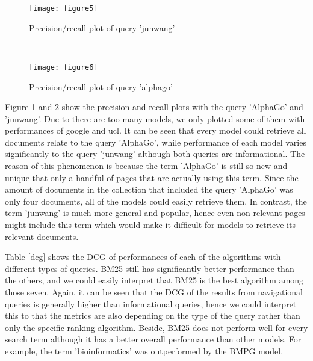 \begin{figure*}[!t]
    \centering
    \begin{subfigure}{0.5\textwidth}
        \centering
        \texttt{[image: figure5]}
        \caption{Precision/recall plot of query 'junwang'}
        \label{fig:junwang}
        \vskip -6pt
    \end{subfigure}%
    ~ 
    \begin{subfigure}{0.5\textwidth}
        \centering
        \texttt{[image: figure6]}
        \caption{Precision/recall plot of query 'alphago'}
        \label{fig:alphago}
        \vskip -6pt
    \end{subfigure}
    \caption{Precision/recall curves for two example queries.}
\end{figure*}

Figure \ref{fig:junwang} and \ref{fig:alphago} show the precision and recall plots with the query 'AlphaGo' and 'junwang'. Due to there are too many models, we only plotted some of them with performances of google and ucl. It can be seen that every model could retrieve all documents relate to the query 'AlphaGo', while performance of each model varies significantly to the query 'junwang' although both queries are informational. The reason of this phenomenon is because the term 'AlphaGo' is still so new and unique that only a handful of pages that are actually using this term. Since the amount of documents in the collection that included the query 'AlphaGo' was only four documents, all of the models could easily retrieve them. In contrast, the term 'junwang' is much more general and popular, hence even non-relevant pages might include this term which would make it difficult for models to retrieve its relevant documents.

Table \ref{dcg} shows the DCG of performances of each of the algorithms with different types of queries. BM25 still has significantly better performance than the others, and we could easily interpret that BM25 is the best algorithm among those seven. Again, it can be seen that the DCG of the results from navigational queries is generally higher than informational queries, hence we could interpret this to that the metrics are also depending on the type of the query rather than only the specific ranking algorithm. Beside, BM25 does not perform well for every search term although it has a better overall performance than other models. For example, the term 'bioinformatics' was outperformed by the BMPG model.

